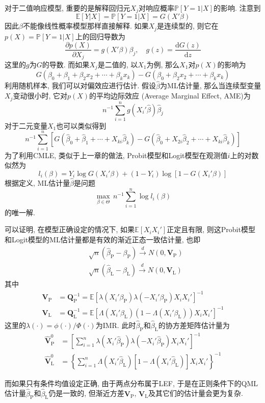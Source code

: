 \documentclass[cn, 12pt, math=mtpro2, bibstyle=apa, blue, twocol]{elegantbook}
\newcommand{\E}{\mathbb{E}}
\newcommand{\PP}{\mathbb{P}}
\newcommand{\Q}{\mathbold{Q}}
\newcommand{\hb}{\hat{\beta}}
\newcommand{\V}{\mathbold{V}}
\begin{document}
对于二值响应模型, 重要的是解释回归元$X_j$对响应概率$\PP[Y=1|X]$的影响. 注意到
$$\E[Y|X]=\PP[Y=1|X]=G(X'\beta)$$
因此$\beta$不能像线性概率模型那样直接解释. 如果$X_j$是连续型的, 则它在$p(X)=\PP[Y=1|X]$上的回归导数为
$$\frac{\partial p(X)}{\partial X_j}=g(X'\beta)\beta_j,\quad g(z)=\frac{\text{d}G(z)}{\text{d}z}$$
这里的$g$为$G$的导数. 而如果$X_j$是二值的, 以$X_1$为例, 那么$X_1$对$p(X)$的影响为
$$G(\beta_0+\beta_1+\beta_2x_2+\cdots+\beta_kx_k)-G(\beta_0+\beta_2x_2+\cdots+\beta_kx_k)$$
利用随机样本, 我们可以对偏效应进行估计. 假设$\hb$为ML估计量, 那么当连续型变量$X_j$变动很小时, 它对$p(X)$的平均边际效应 (Average Marginal Effect, AME)为
$$n^{-1}\sum_{i=1}^{n}g(X_i'\hb)\hb_j$$
对于二元变量$X_1$也可以类似得到
$$n^{-1}\sum_{i=1}^{n}[G(\hb_0+\hb_1+\cdots+X_{ki}\hb_k)-G(\hb_0+X_{2i}\hb_2+\cdots+X_{ki}\hb_k)]$$
为了利用CMLE, 类似于上一章的做法, Probit模型和Logit模型在观测值$i$上的对数似然为
$$l_i(\beta)=Y_i\log G(X_i'\beta)+(1-Y_i)\log[1-G(X_i'\beta)]$$
根据定义, ML估计量$\hb$是问题
$$\max_{\beta\in\Theta}\,n^{-1}\sum_{i=1}^{n}\log l_i(\beta)$$
的唯一解.

可以证明, 在模型正确设定的情况下, 如果$\E[X_iX_i']$正定且有限, 则这Probit模型和Logit模型的ML估计量都是有效的渐近正态一致估计量, 也即
\begin{align*}
&\sqrt{n}(\hb_{\text{P}}-\beta_\text{P})\xrightarrow{d}N(0,\V_\text{P}) \\
&\sqrt{n}(\hb_{\text{L}}-\beta_\text{L})\xrightarrow{d}N(0,\V_\text{L})
\end{align*}
其中
\begin{align*}
\V_\text{P}&=\Q_\text{P}^{-1}=\E[\lambda(X_i'\beta_\text{P})\lambda(-X_i'\beta_{\text{P}})X_iX_i']^{-1} \\
\V_\text{L}&=\Q_\text{L}^{-1}=\E[\Lambda(X_i'\beta_\text{L})(1-\Lambda(X_i'\beta_\text{L}))X_iX_i']^{-1}
\end{align*}
这里的$\lambda(\cdot)=\phi(\cdot)/\Phi(\cdot)$为IMR. 此时$\hb_\text{P}$和$\hb_\text{L}$的协方差矩阵估计量为
\begin{align*}
\hat{\V}_\text{P}^0&=\left[\sum_{i=1}^{n}\lambda(X_i'\hb_\text{P})\lambda(-X_i'\hb_\text{P})X_iX_i'\right]^{-1} \\
\hat{\V}_\text{L}^0&=\left\{\sum_{i=1}^{n}\Lambda(X_i'\hb_\text{L})[1-\Lambda(X_i'\hb_\text{L})]X_iX_i'\right\}^{-1}
\end{align*}

而如果只有条件均值设定正确, 由于两点分布属于LEF, 于是在正则条件下的QML估计量$\hb_\text{P}$和$\hb_\text{L}$仍是一致的, 但渐近方差$\V_\text{P}$, $\V_\text{L}$及其它们的估计量会更为复杂.
\end{document}
